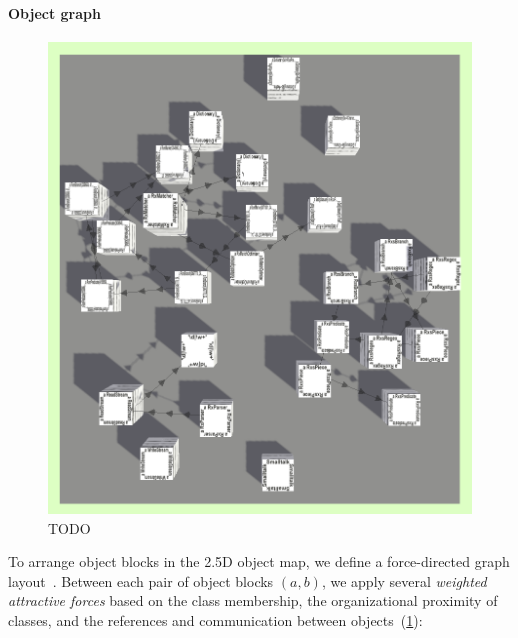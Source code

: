 \paragraph{Object graph}
\label{sec:visualization_approach/mapping/object_graph}

\begin{figure}
	\includegraphics[height=.25\textheight]{sections/03_visualization_approach/mapping/object_graph}
	\caption{TODO}
	\label{fig:visualization_approach/mapping/object_graph}
\end{figure}

To arrange object blocks in the 2.5D object map, we define a force-directed graph layout~\cite{fruchterman1991graph}.
Between each pair of object blocks $(a, b)$, we apply several \emph{weighted attractive forces} based on the class membership, the organizational proximity of classes, and the references and communication between objects~(\cref{fig:visualization_approach/mapping/object_graph}):

